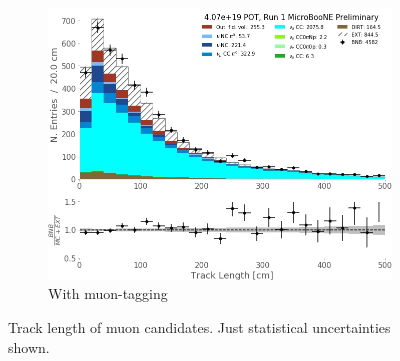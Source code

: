 \begin{figure}[H]
\begin{center}
\begin{subfigure}[b]{0.3\textwidth}
    \end{subfigure} %
    \begin{subfigure}[b]{0.3\textwidth}
    \centering
    \includegraphics[width=1.00\textwidth]{NuMuCCsel/Images/Ryan/Run1_trklen_fullSel.jpg}
    \caption{\label{fig:NuMUCCsel:ryan:trklenFull}  With muon-tagging}
    \end{subfigure}
\caption{Track length of muon candidates. Just statistical uncertainties shown.}
\end{center}
\end{figure}

